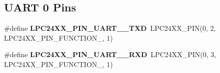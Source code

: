 \subsection*{U\+A\+RT 0 Pins}
\begin{DoxyCompactItemize}
\item 
\mbox{\label{group__lpc24xx__io_gac7ff2f5158bf889d6e04c9216fcbd2fe}} 
\#define {\bfseries L\+P\+C24\+X\+X\+\_\+\+P\+I\+N\+\_\+\+U\+A\+R\+T\+\_\+\_\+\+T\+XD}~L\+P\+C24\+X\+X\+\_\+\+P\+IN(0, 2, L\+P\+C24\+X\+X\+\_\+\+P\+I\+N\+\_\+\+F\+U\+N\+C\+T\+I\+O\+N\+\_, 1)
\item 
\mbox{\label{group__lpc24xx__io_ga4dd4f59d9e6f80f106c4f1126b0c5d24}} 
\#define {\bfseries L\+P\+C24\+X\+X\+\_\+\+P\+I\+N\+\_\+\+U\+A\+R\+T\+\_\+\_\+\+R\+XD}~L\+P\+C24\+X\+X\+\_\+\+P\+IN(0, 3, L\+P\+C24\+X\+X\+\_\+\+P\+I\+N\+\_\+\+F\+U\+N\+C\+T\+I\+O\+N\+\_, 1)
\end{DoxyCompactItemize}
